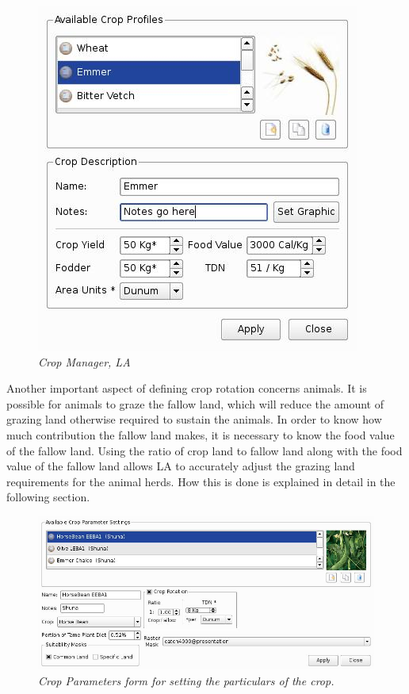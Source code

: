 \begin{figure}[htbp]
  \includegraphics[scale=.59]{./images/cropManager.jpg}
  \caption{\label{fig:cropManager}\textit{Crop Manager, LA}}
\end{figure}
    Another important aspect of defining crop rotation concerns animals.  It is
    possible for animals to graze the fallow land, which will reduce the amount
    of grazing land otherwise required to sustain the animals.  In order to
    know how much contribution the fallow land makes, it is necessary to know
    the food value of the fallow land.  Using the ratio of crop land to fallow
    land along with the food value of the fallow land allows LA to
    accurately adjust the grazing land requirements for the animal herds.  How
    this is done is explained in detail in the following section.

\begin{figure}[htbp] %
  \includegraphics[scale=.27]{./images/cropParameters.jpg}
  \caption[Crop Parameters]{\label{fig:cropParameters}\textit{Crop
    Parameters form for setting the particulars of the crop.}}
\end{figure}
